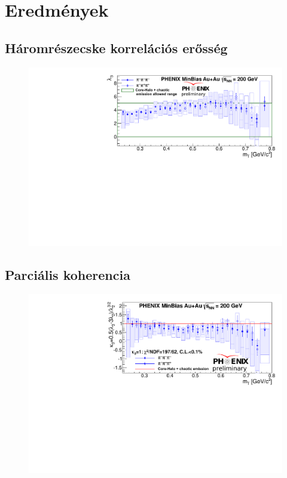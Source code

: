 \documentclass[11pt,a4paper]{article}
\numberwithin{equation}{subsection}
\numberwithin{figure}{section}
\begin{document}
\section{Eredmények}

\subsection{Háromrészecske korrelációs erősség}
\begin{figure}[H]
\centering
\includegraphics[scale=0.75]{pic/res/lambda3.pdf}
\end{figure}

\subsection{Parciális koherencia}
\begin{figure}[H]
\centering
\includegraphics[scale=0.75]{pic/res/kappa3.pdf}
\end{figure}
\end{document}
